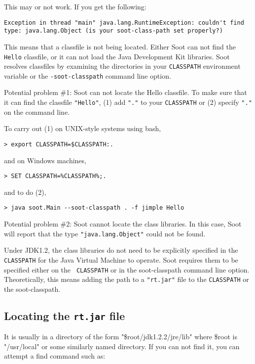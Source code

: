 \documentclass{article}
\begin{document}
This may or not work.  If you get the following:

\begin{verbatim}
Exception in thread "main" java.lang.RuntimeException: couldn't find type: java.lang.Object (is your soot-class-path set properly?)
\end{verbatim}

This means that a classfile is not being located.  Either Soot can not
find the {\tt Hello} classfile, or it can not load the Java
Development Kit libraries.  Soot resolves classfiles by examining the
directories in your {\tt CLASSPATH} environment variable or the
{\tt -soot-classpath} command line option.

Potential problem \#1: Soot can not locate the Hello classfile. To make
sure that it can find the classfile {\tt "Hello"}, (1) add {\tt "."} 
to your {\tt CLASSPATH} or (2) specify {\tt "."} on the command line.

To carry out (1) on UNIX-style systems using bash,
\begin{verbatim}
> export CLASSPATH=$CLASSPATH:.
\end{verbatim}
and on Windows machines,
\begin{verbatim}
> SET CLASSPATH=%CLASSPATH%;.
\end{verbatim}

and to do (2), 
\begin{verbatim}
> java soot.Main --soot-classpath . -f jimple Hello
\end{verbatim}

Potential problem \#2: Soot cannot locate the class libraries.  In this
case, Soot will report that the type {\tt "java.lang.Object"} could not
be found.

Under JDK1.2, the class libraries do not need to be explicitly
specified in the {\tt CLASSPATH} for the Java Virtual Machine to
operate.  Soot requires them to be specified either on the {\tt
CLASSPATH} or in the soot-classpath command line option.
Theoretically, this means adding the path to a {\tt "rt.jar"} file to the
{\tt CLASSPATH} or the soot-classpath.

\subsection{Locating the {\tt rt.jar} file}

It is usually in a directory of the form "\$root/jdk1.2.2/jre/lib"
where \$root is "/usr/local" or some similarly named directory.  If you
can not find it, you can attempt a find command such as:
\end{document}
